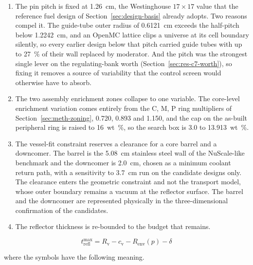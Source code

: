 \begin{enumerate}
  \item The pin pitch is fixed at \SI{1.26}{cm}, the Westinghouse
        $17\times17$ value that the reference fuel design of
        Section~\ref{sec:design-basis} already adopts. Two reasons
        compel it. The guide-tube outer radius of \SI{0.6121}{cm}
        exceeds the half-pitch below \SI{1.2242}{cm}, and an OpenMC
        lattice clips a universe at its cell boundary silently, so
        every earlier design below that pitch carried guide tubes with
        up to \SI{27}{\%} of their wall replaced by moderator. And the
        pitch was the strongest single lever on the regulating-bank
        worth (Section~\ref{sec:res-c7-worth}), so fixing it removes a
        source of variability that the control screen would otherwise
        have to absorb.

  \item The two assembly enrichment zones collapse to one variable.
        The core-level enrichment variation comes entirely from the
        C, M, P ring multipliers of Section~\ref{sec:meth-zoning},
        \num{0.720}, \num{0.893} and \num{1.150}, and the cap on the
        as-built peripheral ring is raised to \SI{16}{wt\%}, so the
        search box is 3.0 to \SI{13.913}{wt\%}.

  \item The vessel-fit constraint reserves a clearance for a core
        barrel and a downcomer. The barrel is the \SI{5.08}{cm}
        stainless steel wall of the NuScale-like benchmark and the
        downcomer is \SI{2.0}{cm}, chosen as a minimum coolant return
        path, with a sensitivity to \SI{3.7}{cm} run on the candidate
        designs only. The clearance enters the geometric constraint
        and not the transport model, whose outer boundary remains a
        vacuum at the reflector surface. The barrel and the downcomer
        are represented physically in the three-dimensional
        confirmation of the candidates.

  \item The reflector thickness is re-bounded to the budget that
        remains.
\end{enumerate}

\begin{equation}
t_\mathrm{refl}^{\max} = R_\mathrm{v} - c_\mathrm{v} - R_\mathrm{env}(p) - \delta
\label{eq:refl-budget-c8}
\end{equation}

\noindent where the symbols have the following meaning.

